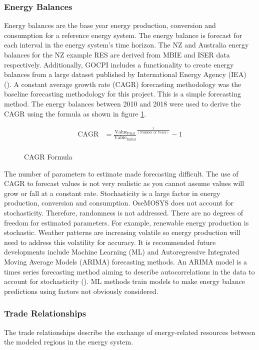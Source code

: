 \documentclass[12pt]{article}
\begin{document}
\subsubsection{Energy Balances}
Energy balances are the base year energy production, conversion and consumption for a reference energy system.
The energy balance is forecast for each interval in the energy system's time horizon.
The NZ and Australia energy balances for the NZ example RES are derived from MBIE and ISER data respectively.
Additionally, GOCPI includes a functionality to create energy balances from a large dataset published by International Energy Agency (IEA) (\cite{IEA_WEB}).
A constant average growth rate (CAGR) forecasting methodology was the baseline forecasting methodology for this project.
This is a simple forecasting method. The energy balances between 2010 and 2018 were used to derive the CAGR using the formula as shown in figure \ref{fig:CAGR}.

\begin{figure}
	\begin{align*}
		\text{CAGR} &= \frac{\text{Value}_{\text{Final}}}{\text{Value}_{\text{Initial}}}^{\frac{1}{(\text{Number of Years})}} - 1\\
	\end{align*}
	\caption{CAGR Formula}
	\label{fig:CAGR}
\end{figure}
The number of parameters to estimate made forecasting difficult. The use of CAGR to forecast values is not very realistic as you cannot assume values will grow or fall at a constant rate.
Stochasticity is a large factor in energy production, conversion and consumption.
OseMOSYS does not account for stochasticity. Therefore, randomness is not addressed. 
There are no degrees of freedom for estimated parameters.
For example, renewable energy production is stochastic. Weather patterns are increasing volatile so energy production will need to address this volatility for accuracy.
It is recommended future developments include Machine Learning (ML) and Autoregressive Integrated Moving Average Models (ARIMA) forecasting methods. 
An ARIMA model is a times series forecasting method aiming to describe autocorrelations in the data to account for stochasticity (\cite{ARIMA}). 
ML methods train models to make energy balance predictions using factors not obviously considered. 

\subsubsection{Trade Relationships}
The trade relationships describe the exchange of energy-related resources between the modeled regions in the energy system.
\end{document}
